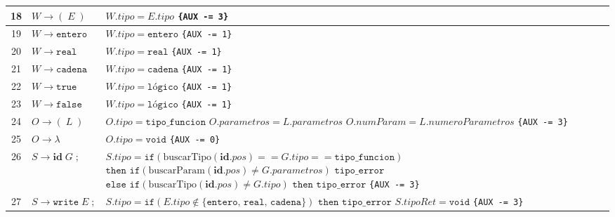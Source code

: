 \documentclass{article}
\begin{document}
\begin{longtable}{|c|>{\raggedright\arraybackslash}p{5.5cm}|>{\raggedright\arraybackslash}p{10cm}|}
18 & $W \to ( \; E \; )$ & 
$W.tipo = E.tipo$ \newline
\texttt{\{AUX -= 3\}} \\ \hline

19 & $W \to \texttt{entero}$ & $W.tipo = \texttt{entero}$ \hspace{1cm} \texttt{\{AUX -= 1\}} \\ \hline
20 & $W \to \texttt{real}$ & $W.tipo = \texttt{real}$ \hspace{1.2cm} \texttt{\{AUX -= 1\}} \\ \hline
21 & $W \to \texttt{cadena}$ & $W.tipo = \texttt{cadena}$ \hspace{0.9cm} \texttt{\{AUX -= 1\}} \\ \hline
22 & $W \to \texttt{true}$ & $W.tipo = \texttt{lógico}$ \hspace{1cm} \texttt{\{AUX -= 1\}} \\ \hline
23 & $W \to \texttt{false}$ & $W.tipo = \texttt{lógico}$ \hspace{1cm} \texttt{\{AUX -= 1\}} \\ \hline

24 & $O \to ( \; L \; )$ & 
$O.tipo = \texttt{tipo\_funcion}$ \newline
$O.parametros = L.parametros$ \newline
$O.numParam = L.numeroParametros$ \newline
\texttt{\{AUX -= 3\}} \\ \hline

25 & $O \to \lambda$ & 
$O.tipo = \texttt{void}$ \newline
\texttt{\{AUX -= 0\}} \\ \hline

26 & $S \to \mathbf{id} \; G \; ;$ & 
$S.tipo = \texttt{if}(\text{buscarTipo}(\mathbf{id}.pos) == G.tipo == \texttt{tipo\_funcion})$ \newline
\hspace*{0.5cm} $\texttt{then if}(\text{buscarParam}(\mathbf{id}.pos) \neq G.parametros) \texttt{ tipo\_error}$ \newline
\hspace*{0.5cm} $\texttt{else if}(\text{buscarTipo}(\mathbf{id}.pos) \neq G.tipo) \texttt{ then tipo\_error}$ \newline
\texttt{\{AUX -= 3\}} \\ \hline

27 & $S \to \texttt{write} \; E \; ;$ & 
$S.tipo = \texttt{if}(E.tipo \notin \{\texttt{entero, real, cadena}\}) \texttt{ then tipo\_error}$ \newline
$S.tipoRet = \texttt{void}$ \newline
\texttt{\{AUX -= 3\}} \\ \hline


\end{longtable}
\end{document}

